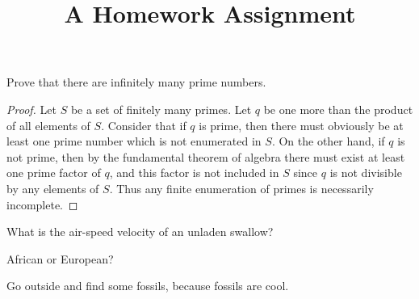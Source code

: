 \documentclass{pset}
\title{A Homework Assignment}
\begin{document}
\begin{problem}
Prove that there are infinitely many prime numbers.
\end{problem}
\begin{proof}
Let $S$ be a set of finitely many primes. Let $q$ be one more than the product of all elements of $S$. Consider that if $q$ is prime, then there must obviously be at least one prime number which is not enumerated in $S$. On the other hand, if $q$ is not prime, then by the fundamental theorem of algebra there must exist at least one prime factor of $q$, and this factor is not included in $S$ since $q$ is not divisible by any elements of $S$. Thus any finite enumeration of primes is necessarily incomplete.
\end{proof}

\begin{problem}
What is the air-speed velocity of an unladen swallow?
\end{problem}
\begin{solution}
African or European?
\end{solution}

\begin{exercise}
Go outside and find some fossils, because fossils are cool.
\end{exercise}
\end{document}
